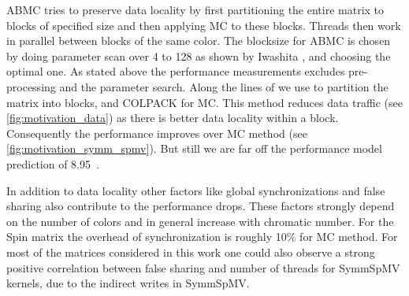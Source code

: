   
 \acrfull{ABMC} tries to preserve data locality by first partitioning the entire matrix to blocks of specified size and then applying \acrlong{MC} to these blocks. Threads then work in parallel between blocks of the same color. The blocksize for \acrshort{ABMC} is chosen by doing parameter scan over 4 to 128 as shown by Iwashita \etal \cite{ABMC}, and choosing the optimal one. As stated above the performance measurements excludes pre-processing and the parameter search. Along the lines of \cite{Park_HPCG} we use \METIS \cite{METIS} to partition the matrix into blocks, and COLPACK for \acrlong{MC}.  This method reduces data traffic (see \cref{fig:motivation_data}) as there is better data locality within a block. Consequently the performance improves over \acrshort{MC} method (see \cref{fig:motivation_symm_spmv}). But still we are far off the performance model prediction of 8.95~\GF.
  
  In addition to data locality other factors like global synchronizations and false sharing also contribute to the performance drops. These factors strongly depend on the number of colors and in general increase with chromatic number. For the Spin matrix the overhead of synchronization is roughly 10\% for \acrshort{MC} method.  For most of the matrices considered in this work one could also observe a strong positive correlation between false sharing and number of threads for \acrshort{SymmSpMV} kernels, due to the indirect writes in \acrshort{SymmSpMV}.
 
 



